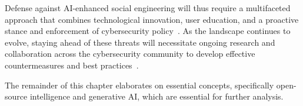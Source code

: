%
%
Defense against AI-enhanced social engineering will thus require a multifaceted approach that combines technological innovation, user education, and a proactive stance and enforcement of cybersecurity policy~\citep{blauth_AI_Crime_Overview_Malicious_Use_Abuse_2022}. As the landscape continues to evolve, staying ahead of these threats will necessitate ongoing research and collaboration across the cybersecurity community to develop effective countermeasures and best practices~\citep{fakhouri_AI_Driven_Solutions_SE_Attacks_2024}.







The remainder of this chapter elaborates on essential concepts, specifically open-source intelligence and generative AI, which are essential for further analysis.












